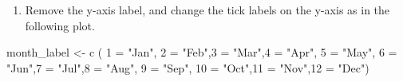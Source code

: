 \documentclass[
]{article}
\newenvironment{Shaded}{\begin{snugshade}}{\end{snugshade}}
\newcommand{\FunctionTok}[1]{\textcolor[rgb]{0.00,0.00,0.00}{#1}}
\newcommand{\NormalTok}[1]{#1}
\newcommand{\OtherTok}[1]{\textcolor[rgb]{0.56,0.35,0.01}{#1}}
\newcommand{\StringTok}[1]{\textcolor[rgb]{0.31,0.60,0.02}{#1}}
\providecommand{\tightlist}{%
  \setlength{\itemsep}{0pt}\setlength{\parskip}{0pt}}
\begin{document}
\begin{enumerate}
\def\labelenumi{\alph{enumi}.}
\setcounter{enumi}{1}
\tightlist
\item
  Remove the y-axis label, and change the tick labels on the y-axis as
  in the following plot.
\end{enumerate}

\begin{Shaded}
\begin{Highlighting}[]
\NormalTok{month\_label }\OtherTok{\textless{}{-}} \FunctionTok{c}\NormalTok{ (}
                \StringTok{\textquotesingle{}1\textquotesingle{}} \OtherTok{=} \StringTok{"Jan"}\NormalTok{, }\StringTok{\textquotesingle{}2\textquotesingle{}} \OtherTok{=} \StringTok{"Feb"}\NormalTok{,}\StringTok{\textquotesingle{}3\textquotesingle{}} \OtherTok{=} \StringTok{"Mar"}\NormalTok{,}\StringTok{\textquotesingle{}4\textquotesingle{}} \OtherTok{=} \StringTok{"Apr"}\NormalTok{,}
                \StringTok{\textquotesingle{}5\textquotesingle{}} \OtherTok{=} \StringTok{"May"}\NormalTok{, }\StringTok{\textquotesingle{}6\textquotesingle{}} \OtherTok{=} \StringTok{"Jun"}\NormalTok{,}\StringTok{\textquotesingle{}7\textquotesingle{}} \OtherTok{=} \StringTok{"Jul"}\NormalTok{,}\StringTok{\textquotesingle{}8\textquotesingle{}} \OtherTok{=} \StringTok{"Aug"}\NormalTok{,}
                \StringTok{\textquotesingle{}9\textquotesingle{}} \OtherTok{=} \StringTok{"Sep"}\NormalTok{, }\StringTok{\textquotesingle{}10\textquotesingle{}} \OtherTok{=} \StringTok{"Oct"}\NormalTok{,}\StringTok{\textquotesingle{}11\textquotesingle{}} \OtherTok{=} \StringTok{"Nov"}\NormalTok{,}\StringTok{\textquotesingle{}12\textquotesingle{}} \OtherTok{=} \StringTok{"Dec"}\NormalTok{)}


\end{Highlighting}
\end{Shaded}
\end{document}
